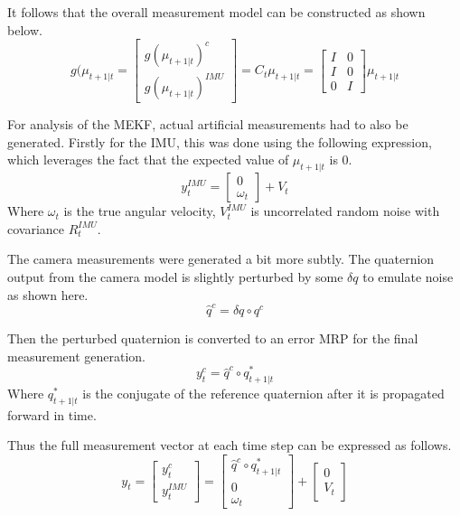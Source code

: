 \documentclass[conference]{IEEEtran}
\begin{document}
It follows that the overall measurement model can be constructed as shown below.
\begin{equation*}
    g(\mu_{t+1|t} = \begin{bmatrix}
        g(\mu_{t+1|t})^{c} \\ g(\mu_{t+1|t})^{IMU}
    \end{bmatrix} = C_t \mu_{t+1|t} = \begin{bmatrix}
        I & 0 \\ I & 0 \\ 0 & I
    \end{bmatrix} \mu_{t+1|t}
\end{equation*}

For analysis of the MEKF, actual artificial measurements had to also be generated. Firstly for the IMU, this was done using the following expression, which leverages the fact that the expected value of $\mu_{t+1|t}$ is 0.
\begin{equation*}
    y_t^{IMU} = \begin{bmatrix}
         0 \\ \omega_t
    \end{bmatrix} + V_t
\end{equation*}
Where $\omega_t$ is the true angular velocity, $V_t^{IMU}$ is uncorrelated random noise with covariance $R_t^{IMU}$.

The camera measurements were generated a bit more subtly. The quaternion output from the camera model is slightly perturbed by some $\delta q$ to emulate noise as shown here.
\begin{equation*}
    \hat{q}^c = \delta q \circ q^c
\end{equation*}

Then the perturbed quaternion is converted to an error MRP for the final measurement generation.
\begin{equation*}
    y_t^c = \hat{q}^c \circ q_{t+1|t}^*
\end{equation*}
Where $q_{t+1|t}^*$ is the conjugate of the reference quaternion after it is propagated forward in time.

Thus the full measurement vector at each time step can be expressed as follows.
\begin{equation*}
    y_t = \begin{bmatrix} y_t^c \\ y_t^{IMU} \end{bmatrix} = \begin{bmatrix}
        \hat{q}^c \circ q_{t+1|t}^* \\ 0 \\ \omega_t
    \end{bmatrix} + \begin{bmatrix}
        0 \\ V_t
    \end{bmatrix}
\end{equation*}
\end{document}
